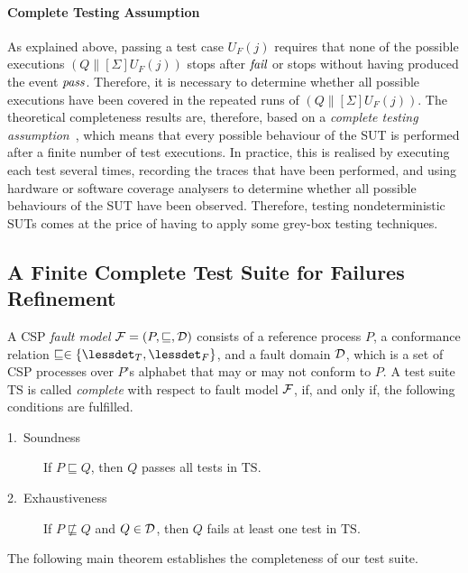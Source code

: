 \documentclass[3p,times]{elsarticle}
\newcommand{\epass}{{\text{\it pass}}}
\newcommand{\efail}{{\text{\it fail}}}
\newcommand{\TS}{{\text{TS}}}
\begin{document}
\paragraph{Complete Testing Assumption} As explained above, passing a test case
$U_F(j)$ requires that none of the possible executions $(Q\parallel[\Sigma]
U_F(j))$ stops after $\efail$ or stops without having produced the event
$\epass$. Therefore, it is necessary to determine whether all possible
executions have been covered in the repeated runs of $(Q\parallel[\Sigma]
U_F(j))$. The theoretical completeness results are, therefore, based on a
\emph{complete testing
assumption}~\cite{hierons_testing_2004,DBLP:conf/icfem/CavalcantiG07}, which
means that every possible behaviour of the SUT is performed after a finite
number of test executions. In practice, this is realised by executing each
test several times, recording the traces that have been performed, and using
hardware or software coverage analysers to determine whether all possible
behaviours of the SUT have been observed. Therefore, testing nondeterministic
SUTs comes at the price of having to apply some grey-box testing techniques.

\subsection{A Finite Complete Test Suite for Failures Refinement}

A CSP \emph{fault model} ${\cal F} = (P,\sqsubseteq,{\cal D})$ consists of a
reference process $P$, a conformance relation $\sqsubseteq \in \{\lessdet_T,
\lessdet_F\}$, and a fault domain ${\cal D}$, which is a set of CSP processes
over $P$'s alphabet that may or may not conform to $P$. A test suite $\TS$ is
called \emph{complete} with respect to fault model ${\cal F}$, if, and only
if, the following conditions are fulfilled.
\begin{description}
\item[1.~Soundness] If $P \sqsubseteq Q$, then $Q$ passes all tests in $\TS$.
\item[2.~Exhaustiveness] If $P \not\sqsubseteq Q$ and $Q\in{\cal D}$,
then $Q$ fails at least one test in $\TS$.
\end{description}
%
The following main theorem establishes the completeness of our test suite.
\end{document}
